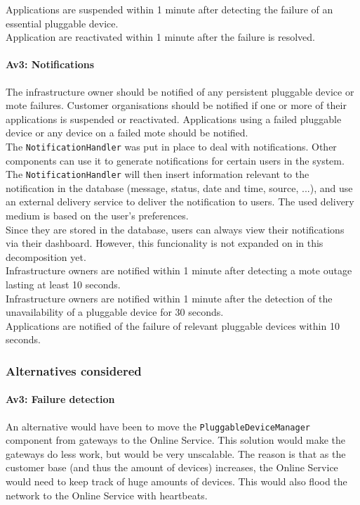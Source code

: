         Applications are suspended within 1 minute after detecting
        the failure of an essential pluggable device. \\
        Application are reactivated within 1 minute after the failure is resolved.

    \paragraph{Av3: Notifications}
        The infrastructure owner should be notified of any persistent
        pluggable device or mote failures. Customer organisations should be
        notified if one or more of their applications is suspended or
        reactivated. Applications using a failed pluggable device or any device
        on a failed mote should be notified. \\
        The \texttt{NotificationHandler} was put in place to deal with
        notifications. Other components can use it to generate notifications for
        certain users in the system. The \texttt{NotificationHandler} will then
        insert information relevant to the notification in the database (message,
        status, date and time, source, ...), and use an external delivery
        service to deliver the notification to users. The used delivery medium
        is based on the user's preferences. \\
        Since they are stored in the database, users can always view
        their notifications via their dashboard. However, this funcionality is not
        expanded on in this decomposition yet. \\

        Infrastructure owners are notified within 1 minute after detecting a mote outage lasting at
        least 10 seconds. \\
        Infrastructure owners are notified within 1 minute after the detection of the unavailability of
        a pluggable device for 30 seconds. \\
        Applications are notified of the failure of relevant pluggable devices within 10 seconds.

    \subsubsection{Alternatives considered}
        \paragraph{Av3: Failure detection}
            An alternative would have been to move the \texttt{PluggableDeviceManager}
            component from gateways to the Online Service. This solution would make the
            gateways do less work, but would be very unscalable. The reason is
            that as the customer base (and thus the amount of devices) increases,
            the Online Service would need to keep track of huge amounts of devices.
            This would also flood the network to the Online Service with heartbeats.

